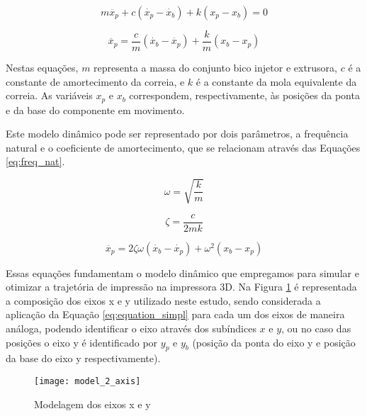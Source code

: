 \begin{equation}
    \label{eq:mov_impressora_1}
    m \ddot{x_p} + c(\dot{x_p} - \dot{x_b}) + k(x_p-x_b) = 0 
\end{equation}

\begin{equation}
    \label{eq:mov_impressora_2}
    \ddot{x_p} = \frac{c}{m}(\dot{x_b} - \dot{x_p}) + \frac{k}{m}(x_b - x_p) 
\end{equation}

Nestas equações, \(m\) representa a massa do conjunto bico injetor e extrusora, \(c\) é a constante de amortecimento da correia, e \(k\) é a constante da mola equivalente da correia. As variáveis \(x_p\) e \(x_b\) correspondem, respectivamente, às posições da ponta e da base do componente em movimento. 

Este modelo dinâmico pode ser representado por dois parâmetros, a frequência natural e o coeficiente de amortecimento, que se relacionam através das Equações \ref{eq:freq_nat}.


\begin{equation}
    \label{eq:freq_nat}
    \omega = \sqrt{\frac{k}{m}}
\end{equation}

\begin{equation}
    \label{eq:amort}
    \zeta = \frac{c}{2mk}
\end{equation}

\begin{equation}
    \label{eq:equation_simpl}
    \ddot{x_p} = 2 \zeta \omega(\dot{x_b} - \dot{x_p}) + \omega ^2(x_b - x_p)
\end{equation}

Essas equações fundamentam o modelo dinâmico que empregamos para simular e otimizar a trajetória de impressão na impressora 3D. Na Figura \ref{fig:model_2_axis} é representada a composição dos eixos x e y utilizado neste estudo, sendo considerada a aplicação da Equação \ref{eq:equation_simpl} para cada um dos eixos de maneira análoga, podendo identificar o eixo através dos subíndices \(x\) e \(y\), ou no caso das posições o eixo y é identificado por \(y_p\) e \(y_b\) (posição da ponta do eixo y e posição da base do eixo y respectivamente).

\begin{figure}[H]
    \centering
    \caption{Modelagem dos eixos x e y}
    \texttt{[image: model\_2\_axis]}

    \label{fig:model_2_axis}
\end{figure}

